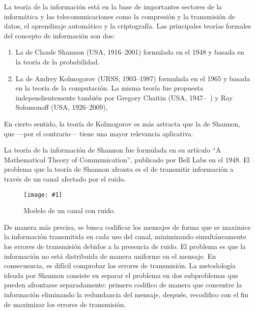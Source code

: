 \documentclass[11pt]{article}
\newcommand{\figscale}[2]{\texttt{[image: \#1]}}
\begin{document}
\begin{center}
\end{center}

\bigskip

La teoría de la información está en la base de importantes sectores de la informática y las telecomunicaciones como la compresión y la transmisión de datos, el aprendizaje automático y la criptografía. Las principales teorías formales del concepto de información son dos:
\begin{enumerate}
\item La de Claude Shannon (USA, 1916--2001) formulada en el 1948 y basada en la teoría de la probabilidad.
\item La de Andrey Kolmogorov (URSS, 1903--1987) formulada en el 1965 y basada en la teoría de la computación. La misma teoría fue propuesta independientemente también por Gregory Chaitin (USA, 1947--\ ) y Ray Solomonoff (USA, 1926--2009), 
\end{enumerate}
En cierto sentido, la teoría de Kolmogorov es más astracta que la de Shannon, que ---por el contrario--- tiene una mayor relevancia aplicativa.


La teoría de la información de Shannon fue formulada en su artículo ``A Mathematical Theory of Communication'', publicado por Bell Labs en el 1948. El problema que la teoría de Shannon afronta es el de transmitir información a través de un canal afectado por el ruido.

\begin{figure}[h]
\begin{center}
\figscale{Images/canal}{0.35}
\end{center}
\caption{
\label{fig:canale}
Modelo de un canal con ruido.
}
\end{figure}

De manera más precisa, se busca codificar los mensajes de forma que se maximice la información transmitida en cada uso del canal, minimizando simultáneamente los errores de transmisión debidos a la presencia de ruido. El problema es que la información no está distribuida de manera uniforme en el mensaje. En consecuencia, es difícil comprobar los errores de transmisión. La metodología ideada por Shannon consiste en separar el problema en dos subproblemas que pueden afrontarse separadamente: primero codifico de manera que concentre la información eliminando la redundancia del mensaje, después, recodifico con el fin de maximizar los errores de transmisión.
\end{document}
